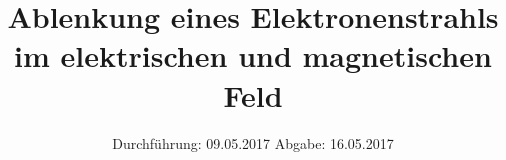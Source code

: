 

\subject{V501}
\title{Ablenkung eines Elektronenstrahls im elektrischen und magnetischen Feld}
\date{
\centering
  Durchführung: 09.05.2017
  \hspace{3em}
  Abgabe: 16.05.2017
}



\maketitle
\thispagestyle{empty}
\tableofcontents
\newpage



%




\printbibliography


